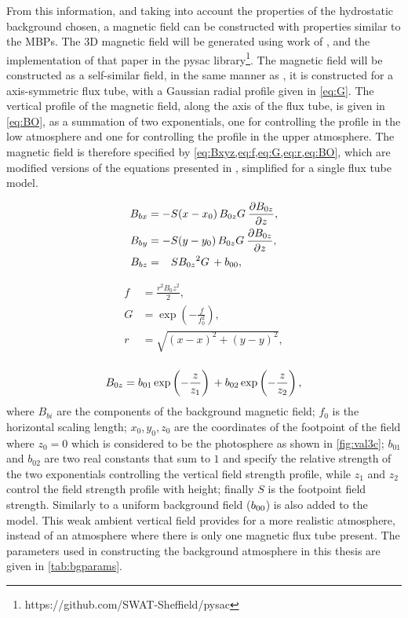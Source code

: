 From this information, and taking into account the properties of the hydrostatic background chosen, a magnetic field can be constructed with properties similar to the MBPs.
The 3D magnetic field will be generated using work of \cite{gent2013, gent2014}, and the implementation of that paper in the pysac library\footnote{https://github.com/SWAT-Sheffield/pysac}.
The magnetic field will be constructed as a self-similar field, in the same manner as \cite{schluter1958}, it is constructed for a axis-symmetric flux tube, with a Gaussian radial profile given in \cref{eq:G}.
The vertical profile of the magnetic field, along the axis of the flux tube, is given in \cref{eq:BO}, as a summation of two exponentials, one for controlling the profile in the low atmosphere and one for controlling the profile in the upper atmosphere.
The magnetic field is therefore specified by \cref{eq:Bxyz,eq:f,eq:G,eq:r,eq:BO}, which are modified versions of the equations presented in \cite{gent2014}, simplified for a single flux tube model.

\begin{equation}\label{eq:Bxyz}
\begin{aligned}
B_{bx} &= -S(x-x_0) {\, {B_{0z}}{G} \:} \frac{\partial {B_{0z}}}{\partial z},
\\
B_{by} &= -S(y-y_0) {\, {B_{0z}}{G} \:} \frac{\partial {B_{0z}}}{\partial z},
\\        
B_{bz} &= \phantom{-}S{{B_{0z}}^2{G}  \,} + {b_{00}},
\end{aligned}
\end{equation}


\begin{align}
f &= \frac{r^2 B_0z^2}{2},  \label{eq:f}
\\
G &= \exp\left(-\frac{f}{f_0^2}\right),  \label{eq:G}
\\
r \,   &= \sqrt{(x-x )^2+(y-y )^2},\\  \label{eq:r}
\end{align}

\begin{equation}\label{eq:BO}
{B_{0z}} = 
{b_{01}}\exp\left(-\frac{z}{{z_{1}}}\right)\,
+
{b_{02}}\exp\left(-\frac{z}{{z_{2}}}\right),
\end{equation}
where $B_{bi}$ are the components of the background magnetic field; $f_0$ is the horizontal scaling length; $x_0,y_0,z_0$ are the coordinates of the footpoint of the field where $z_0=0$ which is considered to be the photosphere as shown in \cref{fig:val3c}; $b_{01}$ and $b_{02}$ are two real constants that sum to $1$ and specify the relative strength of the two exponentials controlling the vertical field strength profile, while $z_1$ and $z_2$ control the field strength profile with height; finally $S$ is the footpoint field strength.
Similarly to \cite{gent2014} a uniform background field (${b_{00}}$) is also added to the model.
This weak ambient vertical field provides for a more realistic atmosphere, instead of an atmosphere where there is only one magnetic flux tube present.
The parameters used in constructing the background atmosphere in this thesis are given in \cref{tab:bgparams}.

